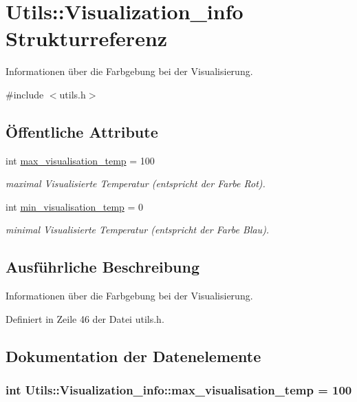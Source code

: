 \hypertarget{structUtils_1_1Visualization__info}{\section{Utils\-:\-:Visualization\-\_\-info Strukturreferenz}
\label{structUtils_1_1Visualization__info}
}


Informationen über die Farbgebung bei der Visualisierung.  




{\ttfamily \#include $<$utils.\-h$>$}

\subsection*{Öffentliche Attribute}
\begin{DoxyCompactItemize}
\item 
int \hyperlink{structUtils_1_1Visualization__info_a5327787a12634166ecc00f2224d3f39f}{max\-\_\-visualisation\-\_\-temp} = 100
\begin{DoxyCompactList}\small\item\em maximal Visualisierte Temperatur (entspricht der Farbe Rot). \end{DoxyCompactList}\item 
int \hyperlink{structUtils_1_1Visualization__info_a6e192352d1f00709f8ef963206ff2653}{min\-\_\-visualisation\-\_\-temp} = 0
\begin{DoxyCompactList}\small\item\em minimal Visualisierte Temperatur (entspricht der Farbe Blau). \end{DoxyCompactList}\end{DoxyCompactItemize}


\subsection{Ausführliche Beschreibung}
Informationen über die Farbgebung bei der Visualisierung. 

Definiert in Zeile 46 der Datei utils.\-h.



\subsection{Dokumentation der Datenelemente}
\hypertarget{structUtils_1_1Visualization__info_a5327787a12634166ecc00f2224d3f39f}{
\subsubsection[{max\-\_\-visualisation\-\_\-temp}]{\setlength{\rightskip}{0pt plus 5cm}int Utils\-::\-Visualization\-\_\-info\-::max\-\_\-visualisation\-\_\-temp = 100}}\label{structUtils_1_1Visualization__info_a5327787a12634166ecc00f2224d3f39f}


